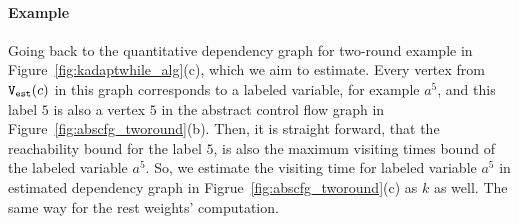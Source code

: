 \paragraph{Example}
Going back to the
quantitative dependency graph for two-round example in
Figure~\ref{fig:kadaptwhile_alg}(c), which we aim to estimate.
%
Every vertex from $\mathtt{{V_{est}}}(c)$ in this graph corresponds to a labeled variable, for example $a^5$,
and this label $5$ is also a vertex $5$ in the abstract control flow graph in Figure~\ref{fig:abscfg_tworound}(b).
Then, it is straight forward, 
that the reachability bound for the label $5$, 
is also the maximum visiting times bound of the labeled variable $a^5$.
So, we estimate the visiting time for  labeled variable $a^5$ in estimated dependency graph in Figrue~\ref{fig:abscfg_tworound}(c) as $k$ as well.
%
The same way for the rest weights' computation.